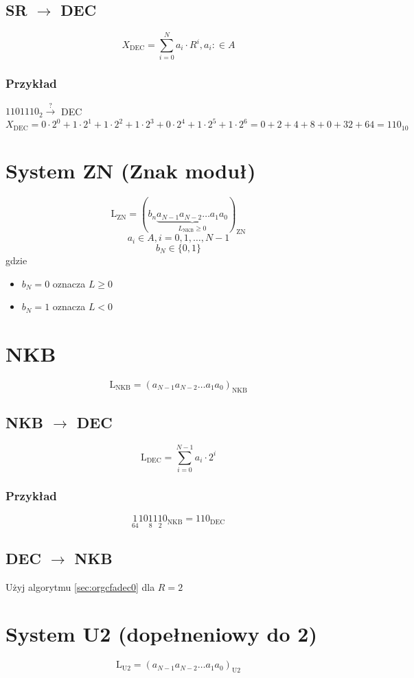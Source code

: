 \documentclass[11pt]{article}
\begin{document}
\subsection{SR \(\to\) DEC}
\label{sec:org6e0241b}
$$X_{\text{DEC}} = \sum_{i=0}^{N} a_i \cdot R^{i}, a_{i}: \in A$$

\subsubsection{Przykład}
\label{sec:org1da290c}
\(1101110_{2} \xrightarrow{?}\) DEC
$$X_{\text{DEC}} = 0 \cdot 2^0 + 1 \cdot 2^1 + 1 \cdot 2^2 + 1 \cdot 2^3 + 0 \cdot 2^4 + 1 \cdot 2^5 + 1 \cdot 2^6 = 0 + 2 + 4 + 8 + 0 + 32 + 64 = 110_{10} $$

\section{System ZN (Znak moduł)}
\label{sec:org74f4d85}
$$\text{L}_{\text{ZN}} = (b_n \underbrace{ a_{N-1} a_{N-2} \dots  a_1 a_0}_{L_{\text{NKB}} \geq 0} )_{\text{ZN}}$$
$$a_i \in A , i=0,1,\dots,N-1$$
$$b_N \in \{0,1\}$$
gdzie
\begin{itemize}
\item \(b_N=0\) oznacza \(L\geq0\)
\item \(b_N=1\) oznacza \(L<0\)
\end{itemize}
\section{NKB}
\label{sec:org2bafe12}
$$\text{L}_{\text{NKB}}=(a_{N-1}a_{N-2} \dots a_1 a_0)_{\text{NKB}}$$
\subsection{NKB \(\to\) DEC}
\label{sec:org89b4361}
$$\text{L}_{\text{DEC}} = \sum_{i=0}^{N-1} a_i \cdot 2^i $$
\subsubsection{Przykład}
\label{sec:orged83c94}
$$\underset{64}{1}10\underset{8}{1}1\underset{2}{1}0_{\text{NKB}} = 110_{\text{DEC}}$$
\subsection{DEC \(\to\) NKB}
\label{sec:org5ffc62b}
Użyj algorytmu \ref{sec:orgcfadec0} dla \(R = 2\)
\section{System U2 (dopełneniowy do 2)}
\label{sec:orgc40cb10}
$$\text{L}_{\text{U2}}=(a_{N-1}a_{N-2} \dots a_1 a_0)_{\text{U2}}$$
\end{document}
